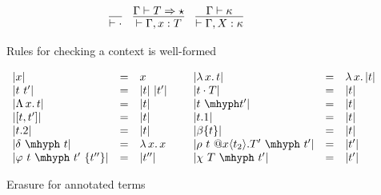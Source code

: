 \documentclass{article}
\newcommand{\absu}[3]{{#1}\, #2.\, #3}
\newcommand{\tpsynth}[0]{\Rightarrow}
\begin{document}
\begin{figure}
  \centering
  \[
    \begin{array}{lll}
      \infer{\vdash \cdot}{}
      & \infer{
        \vdash \Gamma,x:T
        }{\Gamma \vdash T \tpsynth \star}
      & \infer{
        \vdash \Gamma,X:\kappa
        }{
        \Gamma \vdash \kappa
        }
    \end{array}
  \]
  \caption{Rules for checking a context is well-formed}
  \label{fig:ctxt}
\end{figure}


\begin{figure}
  \[
  \begin{array}{lllllll}
    |x| & = & x &\ &
    |\absu{\lambda}{x}{t}| & = & \absu{\lambda}{x}{|t|} \\
    |t\ t'| & = & |t|\ |t'| &\ &
    |t\cdot T| & = & |t| \\
    |\absu{\Lambda}{x}{t}| & = & |t| &\ &
    |t\ \mhyph t'| & = & |t| \\
    |[t , t']| & = & |t| &\ &
    |t.1| & = & |t| \\
    |t.2| & = & |t| &\ &
    |\beta\{t\}| & = & |t|\\
    |\delta\ \mhyph\ t| & = & \absu{\lambda}{x}{x}&\ &
    |\rho\ t\ @x\langle t_2 \rangle.T'\ \mhyph\ t'| & = & |t'| \\
    |\varphi\ t\ \mhyph\ t'\ \{t''\}| & = & |t''| &\ &
    |\chi\ T\ \mhyph\ t'| & = & |t'|
  \end{array}
  \]
  \caption{Erasure for annotated terms}
  \label{fig:eraser}
\end{figure}  
\end{document}
